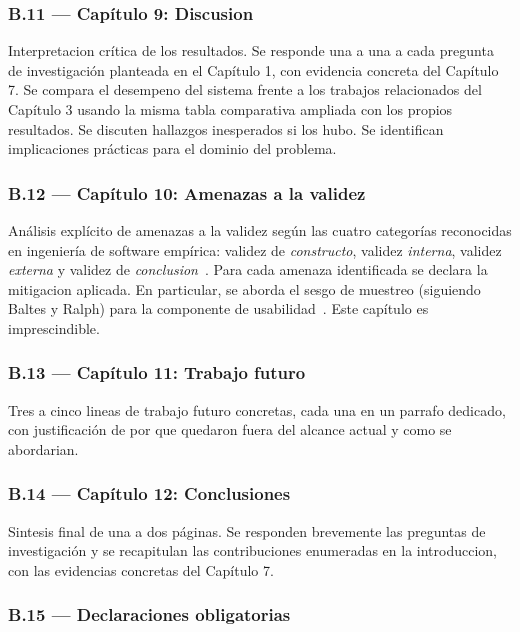 \documentclass[11pt,a4paper]{article}
\begin{document}
\subsubsection*{B.11 --- Cap\'{i}tulo 9: Discusion}

Interpretacion cr\'{i}tica de los resultados. Se responde una a una a cada pregunta de investigaci\'{o}n planteada en el Cap\'{i}tulo 1, con evidencia concreta del Cap\'{i}tulo 7. Se compara el desempeno del sistema frente a los trabajos relacionados del Cap\'{i}tulo 3 usando la misma tabla comparativa ampliada con los propios resultados. Se discuten hallazgos inesperados si los hubo. Se identifican implicaciones pr\'{a}cticas para el dominio del problema.

\subsubsection*{B.12 --- Cap\'{i}tulo 10: Amenazas a la validez}

An\'{a}lisis expl\'{i}cito de amenazas a la validez seg\'{u}n las cuatro categor\'{i}as reconocidas en ingenier\'{i}a de software emp\'{i}rica: validez de \emph{constructo}, validez \emph{interna}, validez \emph{externa} y validez de \emph{conclusion}~\cite{wohlin2012experimentation,runeson2009case}. Para cada amenaza identificada se declara la mitigacion aplicada. En particular, se aborda el sesgo de muestreo (siguiendo Baltes y Ralph) para la componente de usabilidad~\cite{baltes2022sampling}. Este cap\'{i}tulo es imprescindible.

\subsubsection*{B.13 --- Cap\'{i}tulo 11: Trabajo futuro}

Tres a cinco lineas de trabajo futuro concretas, cada una en un parrafo dedicado, con justificaci\'{o}n de por que quedaron fuera del alcance actual y como se abordarian.

\subsubsection*{B.14 --- Cap\'{i}tulo 12: Conclusiones}

Sintesis final de una a dos p\'{a}ginas. Se responden brevemente las preguntas de investigaci\'{o}n y se recapitulan las contribuciones enumeradas en la introduccion, con las evidencias concretas del Cap\'{i}tulo 7.

\subsubsection*{B.15 --- Declaraciones obligatorias}
\end{document}
